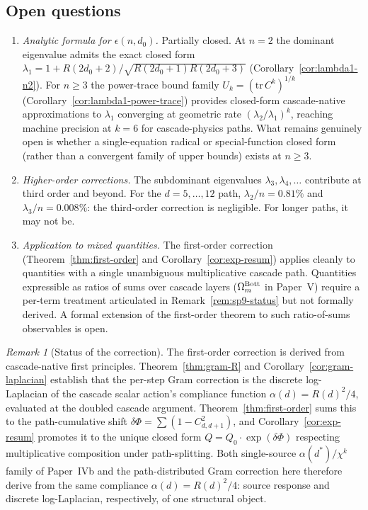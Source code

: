 \documentclass[12pt,a4paper]{article}
\theoremstyle{remark}
\newtheorem*{remark}{Remark}
\begin{document}
\subsection{Open questions}\label{sec:open}

\begin{enumerate}[nosep]
\item \emph{Analytic formula for $\epsilon(n, d_0)$.} Partially closed. At $n = 2$ the dominant eigenvalue admits the exact closed form $\lambda_1 = 1 + R(2d_0+2)/\sqrt{R(2d_0+1)R(2d_0+3)}$ (Corollary~\ref{cor:lambda1-n2}). For $n \geq 3$ the power-trace bound family $U_k = (\mathrm{tr}\,C^k)^{1/k}$ (Corollary~\ref{cor:lambda1-power-trace}) provides closed-form cascade-native approximations to $\lambda_1$ converging at geometric rate $(\lambda_2/\lambda_1)^k$, reaching machine precision at $k = 6$ for cascade-physics paths. What remains genuinely open is whether a single-equation radical or special-function closed form (rather than a convergent family of upper bounds) exists at $n \geq 3$.
\item \emph{Higher-order corrections.} The subdominant eigenvalues $\lambda_3, \lambda_4, \ldots$ contribute at third order and beyond. For the $d = 5, \ldots, 12$ path, $\lambda_2/n = 0.81\%$ and $\lambda_3/n = 0.008\%$: the third-order correction is negligible. For longer paths, it may not be.
\item \emph{Application to mixed quantities.} The first-order correction (Theorem~\ref{thm:first-order} and Corollary~\ref{cor:exp-resum}) applies cleanly to quantities with a single unambiguous multiplicative cascade path. Quantities expressible as ratios of sums over cascade layers ($\Omega_m^{\rm Bott}$ in Paper~V) require a per-term treatment articulated in Remark~\ref{rem:sp9-status} but not formally derived. A formal extension of the first-order theorem to such ratio-of-sums observables is open.
\end{enumerate}

\begin{remark}[Status of the correction]
The first-order correction is derived from cascade-native first principles. Theorem~\ref{thm:gram-R} and Corollary~\ref{cor:gram-laplacian} establish that the per-step Gram correction is the discrete log-Laplacian of the cascade scalar action's compliance function $\alpha(d)=R(d)^2/4$, evaluated at the doubled cascade argument. Theorem~\ref{thm:first-order} sums this to the path-cumulative shift $\delta\Phi=\sum(1-C^2_{d,d+1})$, and Corollary~\ref{cor:exp-resum} promotes it to the unique closed form $Q = Q_0\cdot\exp(\delta\Phi)$ respecting multiplicative composition under path-splitting. Both single-source $\alpha(d^*)/\chi^k$ family of Paper~IVb and the path-distributed Gram correction here therefore derive from the same compliance $\alpha(d)=R(d)^2/4$: source response and discrete log-Laplacian, respectively, of one structural object.
\end{remark}
\end{document}
